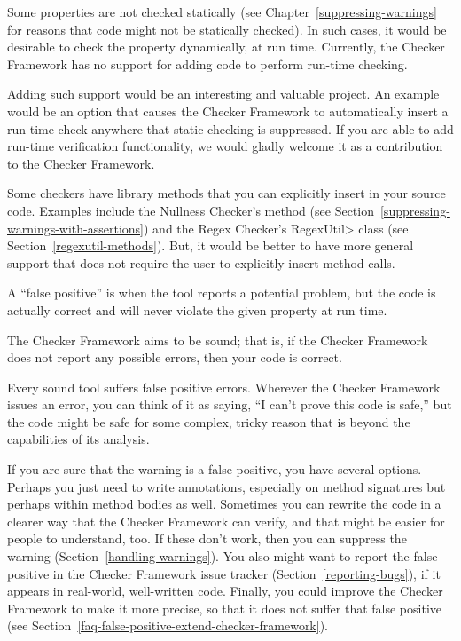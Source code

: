 
Some properties are not checked statically (see
Chapter~\ref{suppressing-warnings} for reasons that code might not be
statically checked).  In such cases, it would be desirable to check the
property dynamically, at run time.
Currently, the Checker Framework has no support for adding code to perform
run-time checking.

Adding such support would be an interesting and valuable project.
An example would be an option that causes the Checker Framework to
automatically insert a run-time check anywhere that static checking is
suppressed.
If you
are able to add run-time verification functionality, we would gladly
welcome it as a contribution to the Checker Framework.

Some checkers have library methods that you can explicitly insert in your
source code.
Examples include the Nullness Checker's
 method (see
Section~\ref{suppressing-warnings-with-assertions}) and the Regex Checker's
\<RegexUtil> class (see Section~\ref{regexutil-methods}).
But, it would be better to have more general support that does not require
the user to explicitly insert method calls.





A ``false positive'' is when the tool reports a potential problem, but the
code is actually correct and will never violate the given property at run
time.

The Checker Framework aims to be sound; that is, if the Checker Framework
does not report any possible errors, then your code is correct.

Every sound tool suffers false positive errors.
Wherever the Checker Framework issues an error, you can think of it as
saying, ``I can't prove this code is safe,'' but the code might be safe for
some complex, tricky reason that is beyond the capabilities of its
analysis.

If you are sure that the warning is a false positive, you have several
options.
Perhaps you just need to write annotations, especially on method signatures
but perhaps within method bodies as well.
Sometimes you can rewrite the code in a clearer way that the Checker
Framework can verify, and that might be easier for people to understand, too.
If these don't work, then you can suppress the warning
(Section~\ref{handling-warnings}).
You also might want to report
the false positive in the Checker Framework issue tracker
(Section~\ref{reporting-bugs}), if it appears in real-world, well-written code.
%
Finally, you could improve the Checker Framework to make it more
precise, so that it does not suffer that false positive (see
Section~\ref{faq-false-positive-extend-checker-framework}).


